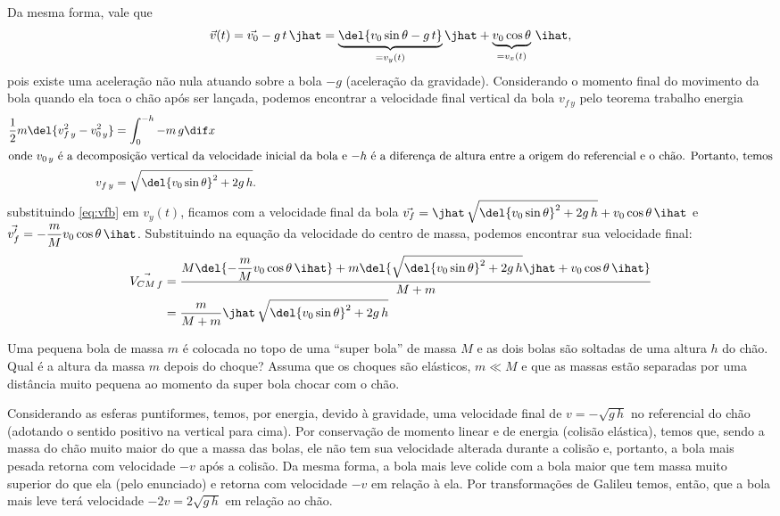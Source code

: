 \documentclass[]{IMTexam}
\begin{document}
\begin{questions}
\begin{solution}
		Da mesma forma, vale que
		\[ \vec{v}(t)=\vec{v_0}-g\,t\,\jhat=\underbrace{\del{v_0\sin\theta-g\,t}}_{=v_y(t)}\jhat+\underbrace{v_0\cos\theta}_{=v_x(t)}\,\ihat, \]
		pois existe uma aceleração não nula atuando sobre a bola $ -g $ (aceleração da gravidade). Considerando o momento final do movimento da bola quando ela toca o chão após ser lançada, podemos encontrar a velocidade final vertical da bola $ v_{f\,y} $ pelo teorema trabalho energia
		\begin{align}
			\dfrac{1}{2}m\del{v_{f\,y}^{2}-v_{0\,y}^{2}}&=\int_{0}^{-h} -m\,g\dif x \nonumber\\
			\intertext{onde $ v_{0\,y} $ é a decomposição vertical da velocidade inicial da bola e $ -h $ é a diferença de altura entre a origem do referencial e o chão. Portanto, temos}
			v_{f\,y}&=\sqrt{\del{v_0\sin\theta}^{2}+2g\,h}. \label{eq:vfb}
		\end{align}
		substituindo \ref{eq:vfb} em $ v_y(t) $, ficamos com a velocidade final da bola $ \vec{v_f}=\jhat\,\sqrt{\del{v_0\sin\theta}^{2}+2g\,h}+v_0\cos\theta\,\ihat $ e $ \vec{v_f'}=-\dfrac{m}{M}v_0\cos\theta\,\ihat $. Substituindo na equação da velocidade do centro de massa, podemos encontrar sua velocidade final:
		\begin{align*}
			\vec{V_{CM\,f}}&=\dfrac{M\del{-\dfrac{m}{M}v_0\cos\theta\,\ihat}+m\del{\sqrt{\del{v_0\sin\theta}^{2}+2g\,h}\jhat+v_0\cos\theta\,\ihat}}{M+m}\\
			&=\dfrac{m}{M+m}\jhat\,\sqrt{\del{v_0\sin\theta}^{2}+2g\,h}
		\end{align*}
	\end{solution}

	\question Uma pequena bola de massa $ m $ é colocada no topo de uma ``super bola'' de massa $ M $ e as dois bolas são soltadas de uma altura $ h $ do chão. Qual é a altura da massa $ m $ depois do choque? Assuma que os choques são elásticos, $ m \ll M $ e que as massas estão separadas por uma distância muito pequena ao momento da super bola chocar com o chão.

	\begin{solution}
		Considerando as esferas puntiformes, temos, por energia, devido à gravidade, uma velocidade final de $ v=-\sqrt{g\,h} $ no referencial do chão (adotando o sentido positivo na vertical para cima). Por conservação de momento linear e de energia (colisão elástica), temos que, sendo a massa do chão muito maior do que a massa das bolas, ele não tem sua velocidade alterada durante a colisão e, portanto, a bola mais pesada retorna com velocidade $ -v $ após a colisão. Da mesma forma, a bola mais leve colide com a bola maior que tem massa muito superior do que ela (pelo enunciado) e retorna com velocidade $ -v $ em relação à ela. Por transformações de Galileu temos, então, que a bola mais leve terá velocidade $ -2v=2\sqrt{g\,h} $ em relação ao chão.
		

\end{solution}
\end{questions}
\end{document}
